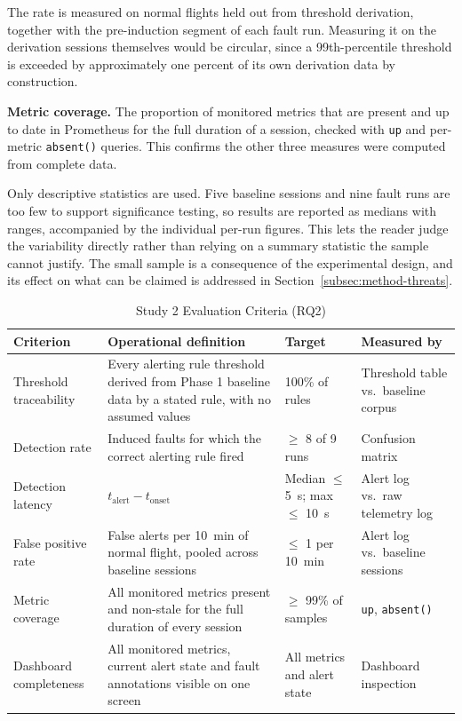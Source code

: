 The rate is measured on normal flights held out from threshold derivation,
together with the pre-induction segment of each fault run. Measuring it on the
derivation sessions themselves would be circular, since a 99th-percentile
threshold is exceeded by approximately one percent of its own derivation data by
construction.

\vspace{0.5em}
\noindent\textbf{Metric coverage.} The proportion of monitored metrics that are
present and up to date in Prometheus for the full duration of a session, checked
with \texttt{up} and per-metric \texttt{absent()} queries. This confirms the
other three measures were computed from complete data.

\vspace{0.5em}
Only descriptive statistics are used. Five baseline sessions and nine fault runs
are too few to support significance testing, so results are reported as medians
with ranges, accompanied by the individual per-run figures. This lets the reader
judge the variability directly rather than relying on a summary statistic the
sample cannot justify. The small sample is a consequence of the experimental
design, and its effect on what can be claimed is addressed in
Section~\ref{subsec:method-threats}.

\begin{table}[htbp]
\centering
\caption{Study 2 Evaluation Criteria (RQ2)}
\label{tab:eval-rq2}
\small
\begin{tabular}{|p{2.8cm}|p{5.4cm}|p{2.6cm}|p{3.0cm}|}
\hline
\textbf{Criterion} & \textbf{Operational definition} & \textbf{Target} & \textbf{Measured by} \\
\hline
Threshold traceability & Every alerting rule threshold derived from Phase 1 baseline data by a stated rule, with no assumed values & 100\% of rules & Threshold table vs.\ baseline corpus \\
\hline
Detection rate & Induced faults for which the correct alerting rule fired & $\geq$ 8 of 9 runs & Confusion matrix \\
\hline
Detection latency & $t_{\text{alert}}-t_{\text{onset}}$ & Median $\leq$ \SI{5}{\second}; max $\leq$ \SI{10}{\second} & Alert log vs.\ raw telemetry log \\
\hline
False positive rate & False alerts per \SI{10}{\minute} of normal flight, pooled across baseline sessions & $\leq$ 1 per \SI{10}{\minute} & Alert log vs.\ baseline sessions \\
\hline
Metric coverage & All monitored metrics present and non-stale for the full duration of every session & $\geq$ 99\% of samples & \texttt{up}, \texttt{absent()} \\
\hline
Dashboard completeness & All monitored metrics, current alert state and fault annotations visible on one screen & All metrics and alert state & Dashboard inspection \\
\hline
\end{tabular}
\end{table}

